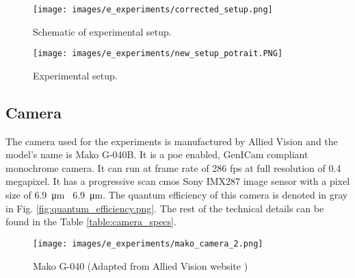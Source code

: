 

\begin{figure}[ht]
    \centering
    \texttt{[image: images/e\_experiments/corrected\_setup.png]}
    \caption{Schematic of experimental setup.}
    \label{fig:corrected_setup.png}
\end{figure}

\begin{figure}[ht]
    \centering
    \texttt{[image: images/e\_experiments/new\_setup\_potrait.PNG]}
    \caption{Experimental setup.}
    \label{fig:new_setup_potrait.PNG}
\end{figure}

\subsection{Camera}
    The camera used for the experiments is manufactured by Allied Vision and the model's name is Mako G-040B. It is a \gls{poe} enabled, GenICam\cite{genicam} compliant monochrome camera. It can run at frame rate of 286 \gls{fps} at full resolution of 0.4 megapixel. It has a progressive scan \gls{cmos} Sony IMX287 image sensor with a pixel size of \SI{6.9}{\micro\meter} \times \ \SI{6.9}{\micro\meter}. The quantum efficiency of this camera is denoted in gray in Fig. \ref{fig:quantum_efficiency.png}. The rest of the technical details can be found in the Table \ref{table:camera_specs}.

    \vspace{10mm}

    \begin{figure}[ht]
        \centering
        \texttt{[image: images/e\_experiments/mako\_camera\_2.png]}
        \caption{Mako G-040 (Adapted from Allied Vision website \cite{mako_camera})}
        \label{fig:mako_camera.png}
    \end{figure}

